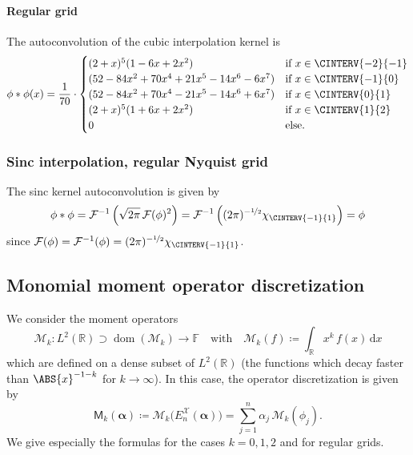 \documentclass[a4paper]{paper}
\newcommand*{\SPC}[1]{{\ensuremath{\mathscr{#1}}}}
\newcommand*{\FIELD}{{\ensuremath{\mathbb{F}}}}
\newcommand{\RR}{{\ensuremath{\mathbb{R}}}}
\newcommand*{\OP}[1]{{\ensuremath{\mathcal{#1}}}}
\newcommand*{\OPM}{\OP{M}}
\newcommand{\DISCOP}[1]{{\ensuremath{\mathsf{#1}}}}
\newcommand*{\EXT}[2]{\ensuremath{E_{#1}^{#2}}}
\newcommand*{\EnX}{{\ensuremath{\EXT{n}{\SPC{X}}}}}
\newcommand*{\FT}{\OP{F}}
\DeclareMathOperator{\DOMAIN}{{dom}}
\DeclareMathOperator{\DEFEQ}{{\coloneqq}}
\newcommand*{\D}{{\ensuremath{\mathrm{d}}}}
\newcommand*{\BDalpha}{\boldsymbol{\alpha}}
\begin{document}
\paragraph{Regular grid}

The autoconvolution of the cubic interpolation kernel is 
%
\begin{equation*}
 \phi \ast \phi(x) = \frac{1}{70} \cdot
 \begin{cases}
  (2+x)^5 (1-6x+2x^2) & \text{if } x \in \CINTERV{-2}{-1} \\
  (52 - 84x^2 + 70x^4 + 21x^5 -14x^6 - 6x^7) & \text{if } x \in \CINTERV{-1}{0} \\
  (52 - 84x^2 + 70x^4 - 21x^5 -14x^6 + 6x^7) & \text{if } x \in \CINTERV{0}{1} \\
  (2+x)^5 (1+6x+2x^2) & \text{if } x \in \CINTERV{1}{2} \\
  0 & \text{else}.
 \end{cases}
\end{equation*}


\subsubsection{Sinc interpolation, regular Nyquist grid}
\label{subsubsec:specif:conv:sinc}

The sinc kernel autoconvolution is given by
%
\begin{equation*}
 \phi \ast \phi = \FT^{-1}\left( \sqrt{2\pi}\, \FT(\phi)^2 \right) 
 = \FT^{-1}\left( (2\pi)^{-\nicefrac{1}{2}} \chi_{\CINTERV{-1}{1}} \right) = \phi
\end{equation*}
%
since $\FT(\phi) = \FT^{-1}(\phi) = (2\pi)^{-\nicefrac{1}{2}} \chi_{\CINTERV{-1}{1}}$.



\subsection{Monomial moment operator discretization}
\label{subsec:specif:moments}


We consider the moment operators
%
\begin{equation*}
 \OPM_k \colon L^2(\RR) \supset \DOMAIN(\OPM_k) \to \FIELD
 \quad\text{with}\quad
 \OPM_k(f) \DEFEQ \int_\RR x^k\, f(x)\, \D x
\end{equation*}
%
which are defined on a dense subset of $L^2(\RR)$ (the functions which decay faster than $\ABS{x}^{-1-k}$ for 
$k \to \infty$). In this case, the operator discretization is given by
%
\begin{equation*}
 \DISCOP{M}_k(\BDalpha) \DEFEQ \OPM_k\big( \EnX(\BDalpha) \big) = \sum_{j=1}^n \alpha_j\, \OPM_k(\phi_j).
\end{equation*}
%
We give especially the formulas for the cases $k=0,1,2$ and for regular grids.
\end{document}
